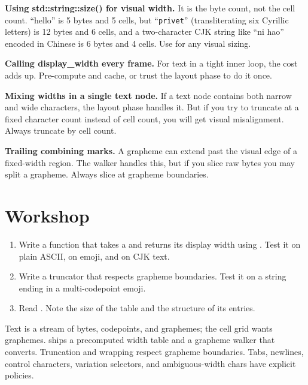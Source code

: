 \begin{warning}
\textbf{Using std::string::size() for visual width.} It is the
byte count, not the cell count. ``hello'' is 5 bytes and 5
cells, but ``\verb|privet|'' (transliterating six Cyrillic
letters) is 12 bytes and 6 cells, and a two-character CJK string
like ``ni hao'' encoded in Chinese is 6 bytes and 4 cells. Use
 for any
visual sizing.
\end{warning}

\begin{warning}
\textbf{Calling display\_width every frame.} For text in a tight
inner loop, the cost adds up. Pre-compute and cache, or trust
the layout phase to do it once.
\end{warning}

\begin{warning}
\textbf{Mixing widths in a single text node.} If a text node
contains both narrow and wide characters, the layout phase
handles it. But if you try to truncate at a fixed
character count instead of cell count, you will get visual
misalignment. Always truncate by cell count.
\end{warning}

\begin{warning}
\textbf{Trailing combining marks.} A grapheme can extend past
the visual edge of a fixed-width region. The walker handles
this, but if you slice raw bytes you may split a grapheme. Always
slice at grapheme boundaries.
\end{warning}

\section*{Workshop}

\begin{enumerate}[leftmargin=*]
  \item Write a function that takes a 
    and returns its display width using .
    Test it on plain ASCII, on emoji, and on CJK text.
  \item Write a truncator that respects grapheme boundaries.
    Test it on a string ending in a multi-codepoint emoji.
  \item Read
    .
    Note the size of the table and the structure of its
    entries.
\end{enumerate}

\begin{recap}
Text is a stream of bytes, codepoints, and graphemes; the cell
grid wants graphemes. \maya{} ships a precomputed width table
and a grapheme walker that converts. Truncation and wrapping
respect grapheme boundaries. Tabs, newlines, control characters,
variation selectors, and ambiguous-width chars have explicit
policies.
\end{recap}

